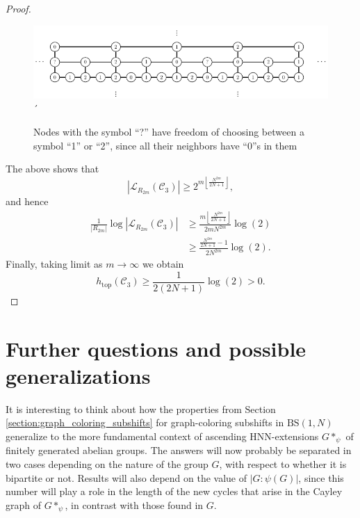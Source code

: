 \documentclass[cupthm,crop,info]{CUP-JNL-ETS}%
\theoremstyle{cupplain}
\theoremstyle{cupdefinition}
\theoremstyle{cupremark}
\theoremstyle{cupproof}
\newtheorem{proof}{Proof}
\numberwithin{equation}{section}
\newcommand{\BS}[1][N]{\mathrm{BS}(1,#1)}
\def\htop{h_{\mathrm{top}}}
\begin{document}
\begin{proof}
	\begin{figure}
		\centering
\includegraphics[]{freespace_entropy.pdf}´
		\caption{Nodes with the symbol ``?'' have freedom of choosing between a symbol ``1'' or ``2'', since all their neighbors have ``0''s in them}
	\end{figure}
	
	The above shows that
	$$
	|\mathcal{L}_{R_{2m}}(\mathcal{C}_3)|\ge 2^{m\left\lfloor \frac{N^{2m}}{2N+1}\right\rfloor },
	$$
	and hence
	\begin{align*}
	\frac{1}{|R_{2m}|}\log |\mathcal{L}_{R_{2m}}(\mathcal{C}_3)|&\ge\frac{m\left\lfloor \frac{N^{2m}}{2N+1}\right\rfloor}{2mN^{2m}}\log(2) \\
	&\ge \frac{\frac{N^{2m}}{2N+1}-1}{2N^{2m}}\log(2).
	\end{align*}
	Finally, taking limit as $m\to\infty$ we obtain
	$$
	\htop(\mathcal{C}_3)\ge \frac{1}{2(2N+1)}\log(2)>0.
	$$
\end{proof}	

\section{Further questions and possible generalizations}
\label{section: further questions}

It is interesting to think about how the properties from Section \ref{section:graph_coloring_subshifts} for graph-coloring subshifts in $\BS$ generalize to the more fundamental context of ascending HNN-extensions $G*_{\psi}$ of finitely generated abelian groups. The answers will now probably be separated in two cases depending on the nature of the group $G$, with respect to whether it is bipartite or not. Results will also depend on the value of $|G:\psi(G)|$, since this number will play a role in the length of the new cycles that arise in the Cayley graph of $G*_{\psi}$, in contrast with those found in $G$.
\end{document}
